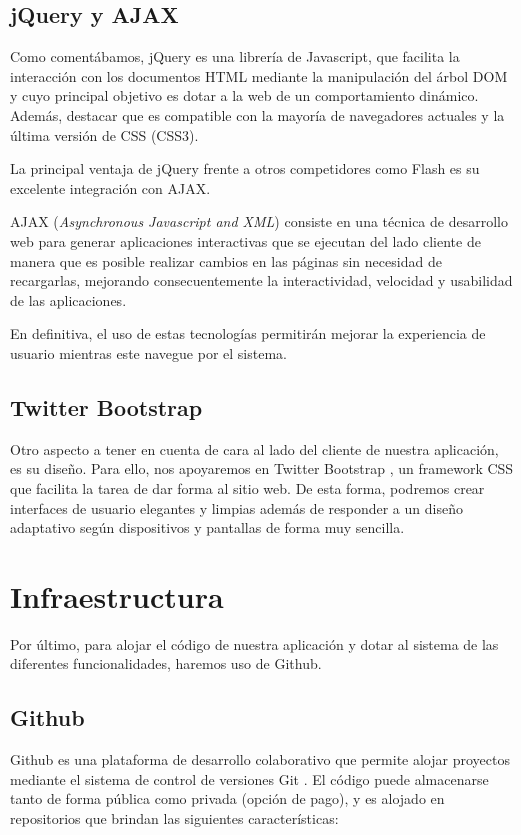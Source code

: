 \subsection{jQuery y AJAX}
Como comentábamos, jQuery \cite{jQuery} es una librería de Javascript, que facilita la interacción con los documentos HTML mediante la manipulación del árbol DOM y cuyo principal objetivo es dotar a la web de un comportamiento dinámico. Además, destacar que es compatible con la mayoría de navegadores actuales y la última versión de CSS (CSS3).

La principal ventaja de jQuery frente a otros competidores como Flash es su excelente integración con AJAX.

AJAX (\textit{Asynchronous Javascript and XML}) \cite{AJAX} consiste en una técnica de desarrollo web para generar aplicaciones interactivas que se ejecutan del lado cliente de manera que es posible realizar cambios en las páginas sin necesidad de recargarlas, mejorando consecuentemente la interactividad, velocidad y usabilidad de las aplicaciones.

En definitiva, el uso de estas tecnologías permitirán mejorar la experiencia de usuario mientras este navegue por el sistema.

\subsection{Twitter Bootstrap}
Otro aspecto a tener en cuenta de cara al lado del cliente de nuestra aplicación, es su diseño. Para ello, nos apoyaremos en Twitter Bootstrap \cite{Bootstrap}, un framework CSS que facilita la tarea de dar forma al sitio web. De esta forma, podremos crear interfaces de usuario elegantes y limpias además de responder a un diseño adaptativo según dispositivos y pantallas de forma muy sencilla.

\section{Infraestructura}

Por último, para alojar el código de nuestra aplicación y dotar al sistema de las diferentes funcionalidades, haremos uso de Github.

\subsection{Github}

Github \cite{Github} es una plataforma de desarrollo colaborativo que permite alojar proyectos mediante el sistema de control de versiones Git \cite{Git}. El código puede almacenarse tanto de forma pública como privada (opción de pago), y es alojado en repositorios que brindan las siguientes características:

